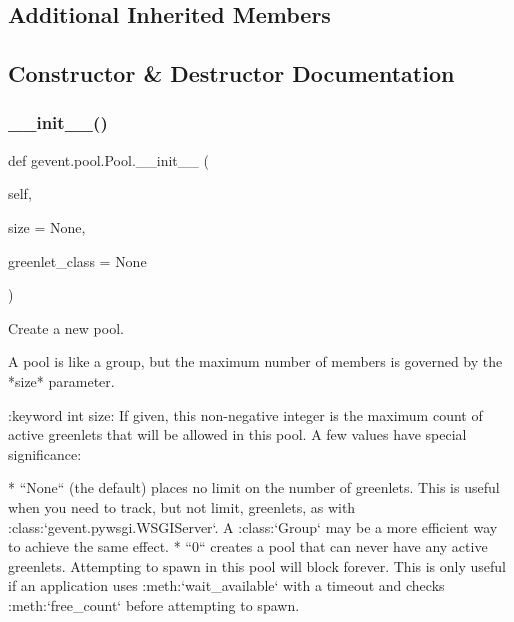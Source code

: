 \subsection*{Additional Inherited Members}


\subsection{Constructor \& Destructor Documentation}
\mbox{\label{classgevent_1_1pool_1_1_pool_ab8f7535704e4be9d689c2f8cb8908363}} 
\subsubsection{\texorpdfstring{\+\_\+\+\_\+init\+\_\+\+\_\+()}{\_\_init\_\_()}}
{\footnotesize\ttfamily def gevent.\+pool.\+Pool.\+\_\+\+\_\+init\+\_\+\+\_\+ (\begin{DoxyParamCaption}\item[{}]{self,  }\item[{}]{size = {\ttfamily None},  }\item[{}]{greenlet\+\_\+class = {\ttfamily None} }\end{DoxyParamCaption})}

\begin{DoxyVerb}Create a new pool.

A pool is like a group, but the maximum number of members
is governed by the *size* parameter.

:keyword int size: If given, this non-negative integer is the
    maximum count of active greenlets that will be allowed in
    this pool. A few values have special significance:

    * ``None`` (the default) places no limit on the number of
      greenlets. This is useful when you need to track, but not limit,
      greenlets, as with :class:`gevent.pywsgi.WSGIServer`. A :class:`Group`
      may be a more efficient way to achieve the same effect.
    * ``0`` creates a pool that can never have any active greenlets. Attempting
      to spawn in this pool will block forever. This is only useful
      if an application uses :meth:`wait_available` with a timeout and checks
      :meth:`free_count` before attempting to spawn.
\end{DoxyVerb}
 

